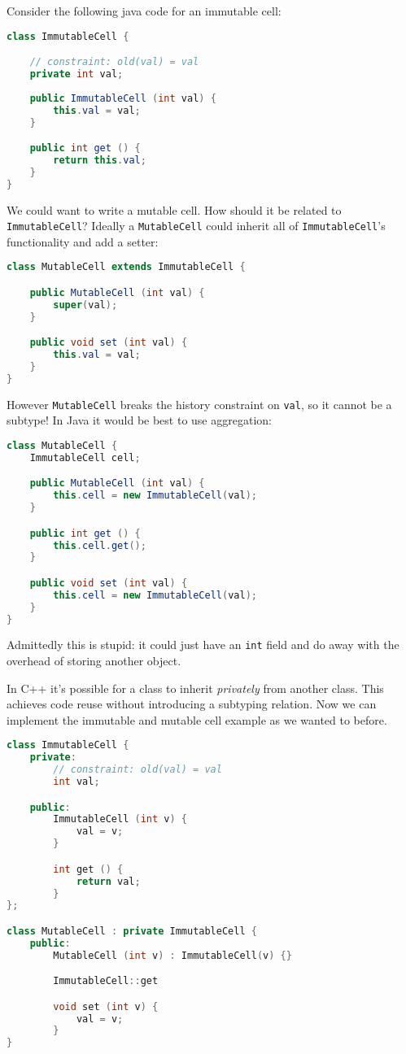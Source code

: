 \documentclass{article}
\begin{document}
\begin{example}
Consider the following java code for an immutable cell:
\begin{lstlisting}[language=Java, escapechar=|]
class ImmutableCell {

    // constraint: old(val) = val
    private int val;
    
    public ImmutableCell (int val) {
        this.val = val;
    }

    public int get () {
        return this.val;
    }
}
\end{lstlisting}
We could want to write a mutable cell. How should it be related to \\ \texttt{ImmutableCell}?
Ideally a \texttt{MutableCell} could inherit all of \texttt{ImmutableCell}'s functionality and add a setter:
\begin{lstlisting}[language=Java, escapechar=|]
class MutableCell extends ImmutableCell {

    public MutableCell (int val) {
        super(val);
    }

    public void set (int val) {
        this.val = val;
    }
}
\end{lstlisting}
However \texttt{MutableCell} breaks the history constraint on \texttt{val}, so it cannot be a \behavioral{} subtype! In Java it would be best to use aggregation:
\begin{lstlisting}[language=Java, escapechar=|]
class MutableCell {
    ImmutableCell cell;

    public MutableCell (int val) {
        this.cell = new ImmutableCell(val);
    }

    public int get () {
        this.cell.get();
    }

    public void set (int val) {
        this.cell = new ImmutableCell(val);
    }
}
\end{lstlisting}
Admittedly this is stupid: it could just have an \texttt{int} field and do away with the overhead of storing another object.
\end{example}

\begin{example}
In C++ it's possible for a class to inherit \textit{privately} from another class. This achieves code reuse without introducing a subtyping relation. Now we can implement the immutable and mutable cell example as we wanted to before.
\begin{lstlisting}[language=C++, escapechar=|]
class ImmutableCell {
    private:
        // constraint: old(val) = val
        int val;

    public:
        ImmutableCell (int v) {
            val = v;
        }

        int get () {
            return val;
        }
};

class MutableCell : private ImmutableCell {
    public:
        MutableCell (int v) : ImmutableCell(v) {}

        ImmutableCell::get

        void set (int v) {
            val = v;
        }
}
\end{lstlisting}
\end{example}
\end{document}

